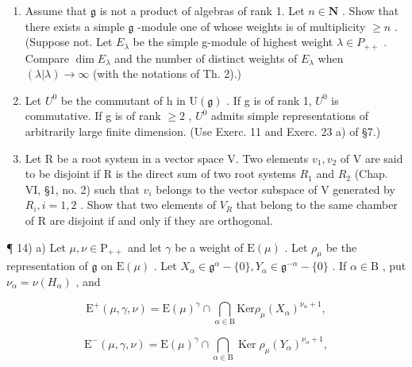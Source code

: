 \begin{enumerate}
\def\labelenumi{\arabic{enumi})}
\setcounter{enumi}{10}
\item
  Assume that \(\mathfrak{g}\) is not a product of algebras of rank 1. Let \(n\in \mathbf{N}\) . Show that there exists a simple \(\mathfrak{g}\) -module one of whose weights is of multiplicity \(\geq n\) . (Suppose not. Let \(E_{\lambda}\) be the simple g-module of highest weight \(\lambda \in P_{++}\) . Compare \(\dim E_{\lambda}\) and the number of distinct weights of \(E_{\lambda}\) when \((\lambda|\lambda) \to \infty\) (with the notations of Th. 2).)
\item
  Let \(U^{0}\) be the commutant of h in \(\mathrm{U}(\mathfrak{g})\) . If g is of rank 1, \(U^{0}\) is commutative. If g is of rank \(\geq 2\) , \(U^{0}\) admits simple representations of arbitrarily large finite dimension. (Use Exerc. 11 and Exerc. 23 a) of §7.)
\item
  Let R be a root system in a vector space V. Two elements \(v_{1}, v_{2}\) of V are said to be disjoint if R is the direct sum of two root systems \(R_{1}\) and \(R_{2}\) (Chap. VI, §1, no. 2) such that \(v_{i}\) belongs to the vector subspace of V generated by \(R_{i}, i = 1, 2\) . Show that two elements of \(V_{R}\) that belong to the same chamber of R are disjoint if and only if they are orthogonal.
\end{enumerate}

¶ 14) a) Let \(\mu, \nu \in \mathrm{P}_{++}\) and let \(\gamma\) be a weight of \(\mathrm{E}(\mu)\) . Let \(\rho_{\mu}\) be the representation of \(\mathfrak{g}\) on \(\mathrm{E}(\mu)\) . Let \(X_{\alpha} \in \mathfrak{g}^{\alpha} - \{0\}, Y_{\alpha} \in \mathfrak{g}^{-\alpha} - \{0\}\) . If \(\alpha \in \mathrm{B}\) , put \(\nu_{\alpha} = \nu(H_{\alpha})\) , and

\[
\mathrm{E} ^ {+} (\mu , \gamma , \nu) = \mathrm{E} (\mu) ^ {\gamma} \cap \bigcap_ {\alpha \in \mathrm{B}} \mathrm{Ker} \rho_ {\mu} (X _ {\alpha}) ^ {\nu_ {\alpha} + 1},
\]

\[
\mathrm{E} ^ {-} (\mu , \gamma , \nu) = \mathrm{E} (\mu) ^ {\gamma} \cap \bigcap_ {\alpha \in \mathrm{B}} \operatorname{Ker} \rho_ {\mu} (Y _ {\alpha}) ^ {\nu_ {\alpha} + 1},
\]